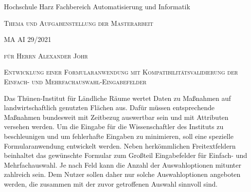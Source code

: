 
\newpage
\thispagestyle{empty}

Hochschule Harz\newline
Fachbereich Automatisierung und Informatik
\vfill
\begin{center}

\large{\textsc{Thema und Aufgabenstellung der Masterarbeit}}

\large{\textsc{MA AI 29/2021}}

\vfill

\large{\textsc{für Herrn Alexander Johr}}

\vfill

\Large{\textsc{Entwicklung einer Formularanwendung mit Kompatibilitätsvalidierung der Einfach- und Mehrfachauswahl-Eingabefelder}}



\end{center}

\vfill




















Das Thünen-Institut für Ländliche Räume wertet Daten zu Maßnahmen auf landwirtschaftlich genutzten Flächen aus. Dafür müssen entsprechende Maßnahmen
bundesweit mit Zeitbezug auswertbar sein und mit Attributen versehen werden.
Um die Eingabe für die Wissenschaftler des Instituts zu beschleunigen
 und um fehlerhafte Eingaben zu minimieren, soll eine 
 spezielle Formularanwendung entwickelt werden.
Neben herkömmlichen Freitextfeldern beinhaltet das gewünschte Formular zum Großteil Eingabefelder für Einfach- und Mehrfachauswahl.
Je nach Feld kann die Anzahl der Auswahloptionen mitunter zahlreich sein.
Dem Nutzer sollen daher nur solche Auswahloptionen angeboten werden,
die zusammen mit der zuvor getroffenen Auswahl sinnvoll sind.


